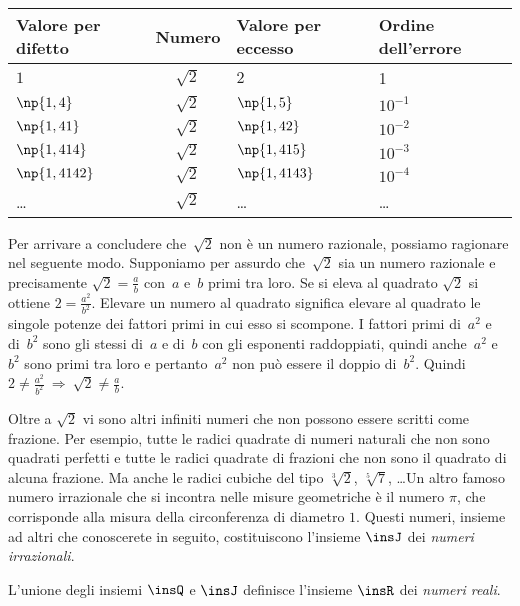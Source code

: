 \begin{center}
 \begin{tabular}{lcll}
\toprule
Valore per difetto & Numero &Valore per eccesso & Ordine dell'errore\\
\midrule
$1$           & $\sqrt{2}$ & $2$           & 1\\
$\np{1,4}$    & $\sqrt{2}$ & $\np{1,5}$    & $10^{-1}$\\
$\np{1,41}$   & $\sqrt{2}$ & $\np{1,42}$   & $10^{-2}$\\
$\np{1,414}$  & $\sqrt{2}$ & $\np{1,415}$  & $10^{-3}$\\
$\np{1,4142}$ & $\sqrt{2}$ & $\np{1,4143}$ & $10^{-4}$\\
\ldots        & $\sqrt{2}$ & \ldots        & \ldots\\
\bottomrule
\end{tabular}
\end{center}

Per arrivare a concludere che~$\sqrt{2}$ non è un numero razionale,
possiamo ragionare nel seguente modo. Supponiamo per assurdo che~$\sqrt{2}$
sia un numero razionale e precisamente $\sqrt{2}=\frac{a}{b}$ con~$a$ e~$b$ primi tra loro. Se si eleva al quadrato $\sqrt{2}$ si ottiene $2=\frac{a^{2}}{b^{2}}$.
Elevare un numero al quadrato significa elevare al quadrato le
singole potenze dei fattori primi in cui esso si scompone. I fattori
primi di~$a^{2}$ e di~$b^{2}$ sono gli stessi di~$a$ e di~$b$ con
gli esponenti raddoppiati, quindi anche~$a^{2}$ e~$b^{2}$
sono primi tra loro e pertanto~$a^{2}$ non può essere il doppio di~$b^{2}$.
Quindi~$2\ne\frac{a^{2}}{b^{2}} \:\Rightarrow\: \sqrt{2}\ne\frac{a}{b}$.

Oltre a $\sqrt{2}$ vi sono altri infiniti numeri che non possono essere scritti come frazione. Per esempio, tutte le radici quadrate di numeri naturali che non sono quadrati perfetti e tutte le radici quadrate di frazioni che non sono il quadrato di alcuna frazione. Ma anche le radici cubiche del tipo $\sqrt[{3}]{2}$, $\sqrt[{5}]{7}$, \dots Un altro famoso numero irrazionale che si incontra nelle misure geometriche è il numero $\pi$, che corrisponde alla
misura della circonferenza di diametro $1$.
Questi numeri, insieme ad altri che conoscerete in seguito, costituiscono l'insieme $\insJ$ dei \emph{numeri irrazionali}.

L'unione degli insiemi $\insQ$ e $\insJ$ definisce l'insieme $\insR$ dei \emph{numeri reali}.

\vspazio\ovalbox{\risolvii \ref{ese:1.1}, \ref{ese:1.2}}

